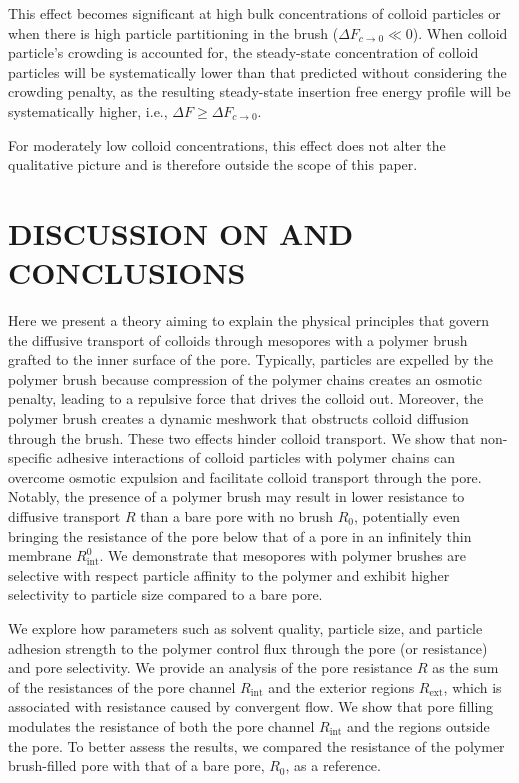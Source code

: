 \documentclass[12pt, a4paper]{article}
\begin{document}
This effect becomes significant at high bulk concentrations of colloid particles or when there is high particle partitioning in the brush ($\Delta F_{c \to 0} \ll 0$). 
When colloid particle's crowding is accounted for, the steady-state concentration of colloid particles will be systematically lower than that predicted without considering the crowding penalty, as the resulting steady-state insertion free energy profile will be systematically higher, i.e., $\Delta F \ge \Delta F_{c \to 0}$.

For moderately low colloid concentrations, this effect does not alter the qualitative picture and is therefore outside the scope of this paper.

\section{DISCUSSION ON AND CONCLUSIONS}
Here we present a theory aiming to explain the physical principles that govern the diffusive transport of colloids through mesopores with a polymer brush grafted to the inner surface of the pore.
Typically, particles are expelled by the polymer brush because compression of the polymer chains creates an osmotic penalty, leading to a repulsive force that drives the colloid out.
Moreover, the polymer brush creates a dynamic meshwork that obstructs colloid diffusion through the brush.
These two effects hinder colloid transport.
We show that non-specific adhesive interactions of colloid particles with polymer chains can overcome osmotic expulsion and facilitate colloid transport through the pore.
Notably, the presence of a polymer brush may result in lower resistance to diffusive transport $R$ than a bare pore with no brush $R_{0}$, potentially even bringing the resistance of the pore below that of a pore in an infinitely thin membrane $R_{\text{int}}^{0}$.
We demonstrate that mesopores with polymer brushes are selective with respect particle affinity to the polymer and exhibit higher selectivity to particle size compared to a bare pore.

We explore how parameters such as solvent quality, particle size, and particle adhesion strength to the polymer control flux through the pore (or resistance) and pore selectivity.
We provide an analysis of the pore resistance $R$ as the sum of the resistances of the pore channel $R_{\text{int}}$ and the exterior regions $R_{\text{ext}}$, which is associated with resistance caused by convergent flow.
We show that pore filling modulates the resistance of both the pore channel $R_{\text{int}}$ and the regions outside the pore.
To better assess the results, we compared the resistance of the polymer brush-filled pore with that of a bare pore, $R_{0}$, as a reference. 
\end{document}
